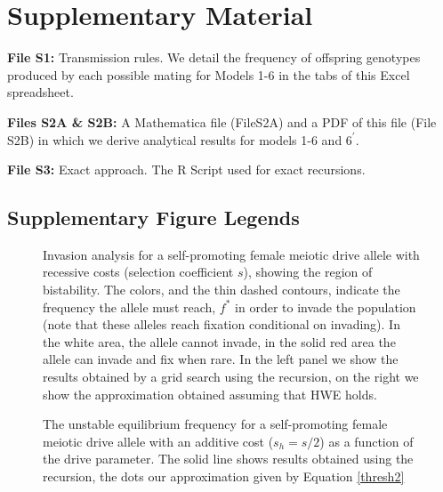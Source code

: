 \documentclass[12pt,letterpaper]{article}
\begin{document}
\clearpage
\newpage
  \setcounter{figure}{0}\global{}

\section*{Supplementary Material}

{\bf{File S1:}} Transmission rules. We detail the frequency of offspring genotypes produced by each possible mating for Models 1-6 in the tabs of this Excel spreadsheet. 


{\bf{Files S2A \& S2B:}} A Mathematica file (FileS2A) and a PDF of this file (File S2B) in which we derive analytical results for models 1-6 and $6^\prime$. 

{\bf{File S3:}} Exact approach. The R Script used for exact recursions.
\clearpage

\newpage
\subsection*{Supplementary Figure Legends}
\clearpage
\begin{figure}
\caption{Invasion analysis for a self-promoting female meiotic drive allele with
  recessive costs (selection coefficient $s$), showing the region of
  bistability. The colors, and the thin dashed contours, indicate the
  frequency the allele must reach, $f^*$ in order to invade the population (note
  that these alleles reach fixation conditional on invading). In the
  white area, the allele cannot invade, in the solid red
  area the allele can invade and fix when rare. In the left panel we
  show the results obtained by a grid search using the recursion, on
  the right we show the approximation obtained assuming that HWE
  holds. }  
\label{Bistab_homozyg_cost_fig}
\end{figure}

\begin{figure}
\caption{The unstable equilibrium frequency for a self-promoting
  female meiotic drive allele with an additive cost ($s_h=s/2$) as a
  function of the drive parameter. The solid line shows results
  obtained using the recursion, the dots our approximation given by Equation \eqref{thresh2}}  \label{bistable_additive}
\end{figure}
\end{document}
